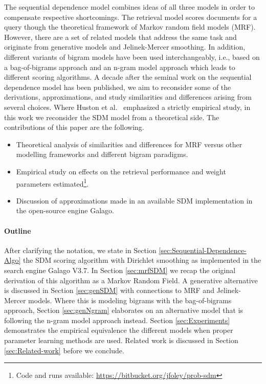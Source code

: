 \documentclass[]{article}
\begin{document}
The sequential dependence model combines ideas of all three models
in order to compensate respective shortcomings. The retrieval model
scores documents for a query though the theoretical framework of Markov
random field models (MRF). However, there are a set of related models
that address the same task and originate from generative models and
Jelinek-Mercer smoothing. In addition, different variants of bigram
models have been used interchangeably, i.e., based on a bag-of-bigrams
approach and an n-gram model approach which leads to different scoring
algorithms. A decade after the seminal work on the sequential dependence
model has been published, we aim to reconsider some of the derivations,
approximations, and study similarities and differences arising from
several choices. Where Huston et al.\ \cite{huston2013termdependencies,huston2014termdepedencies-appendix}
emphasized a strictly empirical study, in this work we reconsider
the SDM model from a theoretical side. The contributions of this paper
are the following.
\begin{itemize}
\item Theoretical analysis of similarities and differences for MRF versus
other modelling frameworks and different bigram paradigms.
\item Empirical study on effects on the retrieval performance and weight
parameters estimated\footnote{Code and runs available: \url{https://bitbucket.org/jfoley/prob-sdm}}.
\item Discussion of approximations made in an available SDM implementation
in the open-source engine Galago.
\end{itemize}

\paragraph{Outline}

After clarifying the notation, we state in Section \ref{sec:Sequential-Dependence-Algo}
the SDM scoring algorithm with Dirichlet smoothing as implemented
in the search engine Galago V3.7. In Section \ref{sec:mrfSDM} we
recap the original derivation of this algorithm as a Markov Random
Field. A generative alternative is discussed in Section \ref{sec:genSDM}
with connections to MRF and Jelinek-Mercer models. Where this is modeling
bigrams with the bag-of-bigrams approach, Section \ref{sec:genNgram}
elaborates on an alternative model that is following the n-gram model
approach instead. Section \ref{sec:Experiments} demonstrates the empirical equivalence the different
models when proper parameter learning methods are used. Related work is discussed
in Section \ref{sec:Related-work} before we conclude.
\end{document}
